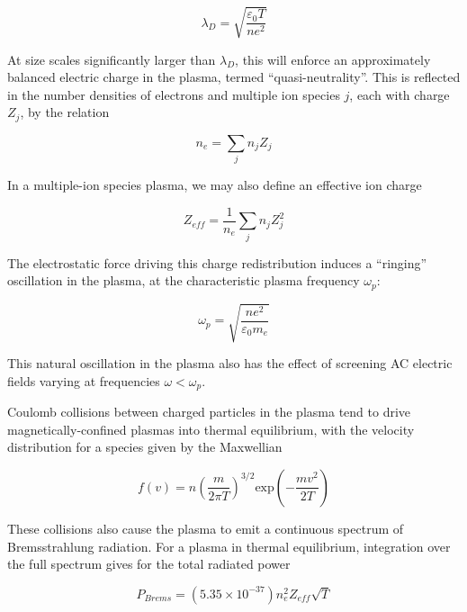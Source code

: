 \begin{equation}\label{eq:debye}
 \lambda_D = \sqrt{ \frac{\varepsilon_0 T}{n e^2} }
\end{equation}

\noindent At size scales significantly larger than $\lambda_D$, this will enforce an approximately balanced electric charge in the plasma, termed ``quasi-neutrality''.  This is reflected in the number densities of electrons and multiple ion species $j$, each with charge $Z_j$, by the relation

\begin{equation}\label{eq:quasineutral}
 n_e = \sum_j{n_j Z_j}
\end{equation}

\noindent In a multiple-ion species plasma, we may also define an effective ion charge

\begin{equation}\label{eq:Zeff}
 Z_{eff} = \frac{1}{n_e} \sum_j{n_j Z_j^2}
\end{equation}

The electrostatic force driving this charge redistribution induces a ``ringing'' oscillation in the plasma, at the characteristic plasma frequency $\omega_p$:

\begin{equation}\label{eq:omegap}
 \omega_p = \sqrt{ \frac{ne^2}{\varepsilon_0 m_e} }
\end{equation}

\noindent This natural oscillation in the plasma also has the effect of screening AC electric fields varying at frequencies $\omega < \omega_p$.

Coulomb collisions between charged particles in the plasma tend to drive magnetically-confined plasmas into thermal equilibrium, with the velocity distribution for a species given by the Maxwellian

\begin{equation}\label{eq:maxwell}
 f(v) = n \left( \frac{m}{2\pi T} \right)^{3/2} \mbox{exp}\left(-\frac{mv^2}{2T} \right)
\end{equation}

\noindent These collisions also cause the plasma to emit a continuous spectrum of Bremsstrahlung radiation.  For a plasma in thermal equilibrium, integration over the full spectrum gives for the total radiated power

\begin{equation}\label{eq:brems}
 P_{Brems} = \left( 5.35 \times 10^{-37} \right) n_e^2 Z_{eff} \sqrt{T}
\end{equation}

